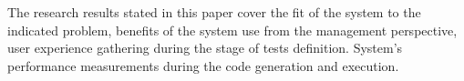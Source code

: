 The research results stated in this paper cover the fit of the system to the indicated problem, benefits of the system use from the management perspective, user experience gathering during the stage of tests definition. System's performance measurements during the code generation and execution.
%
%
%
%
%
%
%

